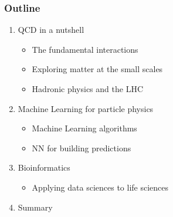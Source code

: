 \documentclass[aspectratio=43]{beamer}
\begin{document}
\begin{frame}

	\frametitle{Outline}
	
	\begin{enumerate}
		\item {\color{blue}QCD in a nutshell}
		\begin{itemize}
			\item The fundamental interactions
			\item Exploring matter at the small scales
			\item Hadronic physics and the LHC
		\end{itemize}
		\item {\color{blue}Machine Learning for particle physics}
		\begin{itemize}	
			\item Machine Learning algorithms
			\item NN for building predictions
		\end{itemize}	
		\item {\color{blue}Bioinformatics}
		\begin{itemize}
			\item Applying data sciences to life sciences
		\end{itemize}
		\item {\color{blue}Summary}
	\end{enumerate}
	
\end{frame}

\begin{frame}


\end{frame}
\end{document}
